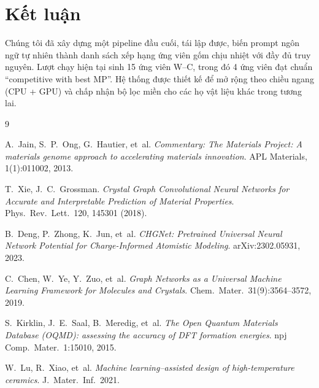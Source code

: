 \documentclass[11pt,a4paper]{report}
\begin{document}
\chapter{Kết luận}

Chúng tôi đã xây dựng một pipeline đầu cuối, tái lập được, biến prompt ngôn ngữ tự nhiên
thành danh sách xếp hạng ứng viên gốm chịu nhiệt với đầy đủ truy nguyên. Lượt chạy hiện tại
sinh 15 ứng viên W--C, trong đó 4 ứng viên đạt chuẩn ``competitive with best MP''. Hệ thống
được thiết kế để mở rộng theo chiều ngang (CPU + GPU) và chấp nhận bộ lọc miền cho các họ
vật liệu khác trong tương lai.

\begin{thebibliography}{9}

A.~Jain, S.~P.~Ong, G.~Hautier, et~al.
\textit{Commentary: The Materials Project: A materials genome approach to accelerating
materials innovation}. APL Materials, 1(1):011002, 2013.

T.~Xie, J.~C.~Grossman.
\textit{Crystal Graph Convolutional Neural Networks for Accurate and Interpretable
Prediction of Material Properties}. Phys.\ Rev.\ Lett.\ 120, 145301 (2018).

B.~Deng, P.~Zhong, K.~Jun, et~al.
\textit{CHGNet: Pretrained Universal Neural Network Potential for Charge-Informed
Atomistic Modeling}. arXiv:2302.05931, 2023.

C.~Chen, W.~Ye, Y.~Zuo, et~al.
\textit{Graph Networks as a Universal Machine Learning Framework for Molecules and
Crystals}. Chem.\ Mater.\ 31(9):3564--3572, 2019.

S.~Kirklin, J.~E.~Saal, B.~Meredig, et~al.
\textit{The Open Quantum Materials Database (OQMD): assessing the accuracy of DFT
formation energies}. npj Comp.\ Mater.\ 1:15010, 2015.

W.~Lu, R.~Xiao, et~al.
\textit{Machine learning--assisted design of high-temperature ceramics}. J.\ Mater.\
Inf.\ 2021.

\end{thebibliography}

\appendix
\end{document}
